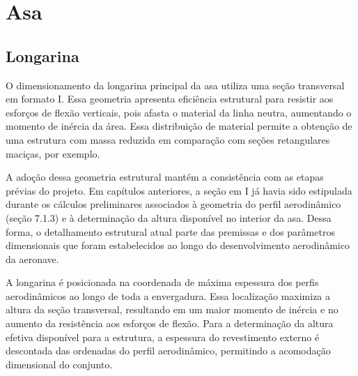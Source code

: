 

\section{Asa}
\subsection{Longarina}
\label{sec:secao_longarina_asa}

O dimensionamento da longarina principal da asa utiliza uma seção transversal em formato I. Essa geometria apresenta eficiência estrutural para resistir aos esforços de flexão verticais, pois afasta o material da linha neutra, aumentando o momento de inércia da área. Essa distribuição de material permite a obtenção de uma estrutura com massa reduzida em comparação com seções retangulares maciças, por exemplo. 

A adoção dessa geometria estrutural mantém a consistência com as etapas prévias do projeto. Em capítulos anteriores, a seção em I já havia sido estipulada durante os cálculos preliminares associados à geometria do perfil aerodinâmico (seção 7.1.3) e à determinação da altura disponível no interior da asa. Dessa forma, o detalhamento estrutural atual parte das premissas e dos parâmetros dimensionais que foram estabelecidos ao longo do desenvolvimento aerodinâmico da aeronave.

A longarina é posicionada na coordenada de máxima espessura dos perfis aerodinâmicos ao longo de toda a envergadura. Essa localização maximiza a altura da seção transversal, resultando em um maior momento de inércia e no aumento da resistência aos esforços de flexão. Para a determinação da altura efetiva disponível para a estrutura, a espessura do revestimento externo é descontada das ordenadas do perfil aerodinâmico, permitindo a acomodação dimensional do conjunto.

